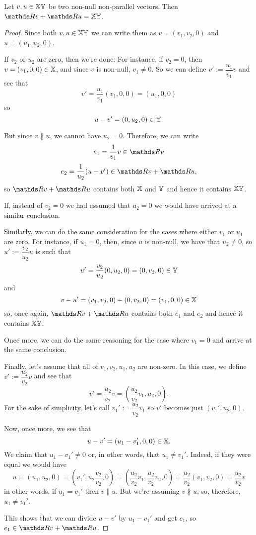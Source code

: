 \begin{lemma}
	Let $v,u\in \mathbb{XY}$ be two non-null non-parallel vectors. Then $\R v+\R u=\mb{XY}$.
\end{lemma}
\begin{proof}
	Since both $v,u\in\mathbb{XY}$ we can write them as $v=(v_1,v_2,0)$ and $u=(u_1,u_2,0)$.
	
	If $v_2$ or $u_2$ are zero, then we're done: For instance, if $v_2=0$, then $v=(v_1,0,0)\in \mathbb X$, and since $v$ is non-null, $v_1\neq 0$. So we can define $v':=\dfrac{u_1}{v_1}v$ and see that
	\[v'=\frac{u_1}{v_1}(v_1,0,0)=\left(u_1,0,0\right)\]so
	\[u-v'=(0,u_2,0)\in \mathbb Y.\]
	
	But since $v\nparallel u$, we cannot have $u_2=0$. Therefore, we can write
	\[e_1=\frac{1}{v_1}v\in \R v\]
	\[e_2=\frac{1}{u_2}(u-v')\in \R v+\R u,\]so $\R v +\R u$ contains both $\mathbb X$ and $\mathbb Y$ and hence it contains $\mathbb{XY}$.
	
	If, instead of $v_2=0$ we had assumed that $u_2=0$ we would have arrived at a similar conclusion.
	
	\bigskip
	Similarly, we can do the same consideration for the cases where either $v_1$ or $u_1$ are zero. For instance, if $u_1=0$, then, since $u$ is non-null, we have that $u_2\neq 0$, so $u':=\dfrac{v_2}{u_2}u$ is such that
	\[u'=\frac{v_2}{u_2}(0,u_2,0)=(0,v_2,0)\in \mathbb Y\]and
	\[v-u'=(v_1,v_2,0)-(0,v_2,0)=(v_1,0,0)\in \mathbb X\]so, once again, $\R v+\R u$ contains both $e_1$ and $e_2$ and hence it contains $\mathbb{XY}$.
	
	Once more, we can do the same reasoning for the case where $v_1=0$ and arrive at the same conclusion.
	
	\bigskip
	Finally, let's assume that all of $v_1,v_2,u_1,u_2$ are non-zero. In this case, we define $v':=\dfrac{u_2}{v_2}v$ and see that
	\[v'=\frac{u_2}{v_2}v=\left(\frac{u_2}{v_2}v_1,u_2,0\right).\] For the sake of simplicity, let's call $v_1':=\dfrac{u_2}{v_2}v_1$ so $v'$ becomes just $(v_1',u_2,0)$.
	
	Now, once more, we see that
	\[u-v'=(u_1-v_1',0,0)\in\mathbb X.\] We claim that $u_1-v_1'\neq 0$ or, in other words, that $u_1\neq v_1'$. Indeed, if they were equal we would have
	\[u=(u_1,u_2,0)=\left(v_1',u_2\frac{v_2}{v_2},0\right)=\left(\dfrac{u_2}{v_2}v_1,\frac{u_2}{v_2}v_2,0\right)=\frac{u_2}{v_2}(v_1,v_2,0)=\frac{u_2}{v_2}v\]in other words, if $u_1=v_1'$ then $v\parallel u$. But we're assuming $v\nparallel u$, so, therefore, $u_1\neq v_1'$.
	
	This shows that we can divide $u-v'$ by $u_1-v_1'$ and get $e_1$, so $e_1\in \R v+\R u$.
	

\end{proof}

